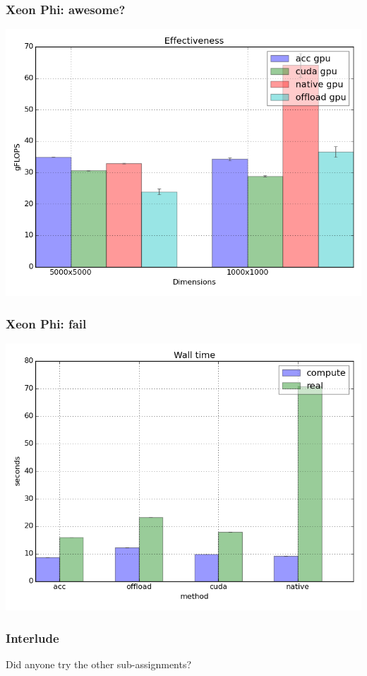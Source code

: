 \documentclass{beamer}
\begin{document}
\begin{frame}
 \frametitle{Xeon Phi: awesome?}
 \includegraphics[width=\textwidth]{bonus_effectivness.png}
\end{frame}

\begin{frame}
 \frametitle{Xeon Phi: fail}
 \includegraphics[width=\textwidth]{bonus_realvscompute.png}
\end{frame}

\begin{frame}
 \frametitle{Interlude}
 Did anyone try the other sub-assignments?
\end{frame}
\end{document}
